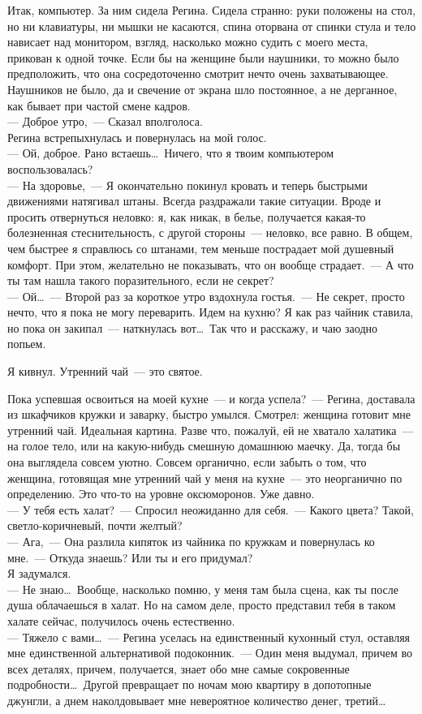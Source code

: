 Итак, компьютер. За ним сидела Регина. Сидела странно: руки положены на стол, 
но 
ни клавиатуры, ни мышки не касаются, спина оторвана от спинки стула и тело 
нависает над монитором, взгляд, насколько можно судить с моего места, прикован 
к 
одной точке. Если бы на женщине были наушники, то можно было предположить, что 
она сосредоточенно смотрит нечто очень захватывающее. Наушников не было, да и 
свечение от экрана шло постоянное, а не дерганное, как бывает при частой смене 
кадров.\\
--- Доброе утро,~--- Сказал вполголоса.\\
Регина встрепыхнулась и повернулась на мой голос.\\
--- Ой, доброе. Рано встаешь\ldots\ Ничего, что я твоим компьютером 
воспользовалась?\\
--- На здоровье,~--- Я окончательно покинул кровать и теперь быстрыми движениями 
натягивал штаны. Всегда раздражали такие ситуации. Вроде и просить отвернуться 
неловко: я, как никак, в белье, получается какая-то болезненная 
стеснительность, с другой стороны~--- неловко, все равно. В общем, чем быстрее я справлюсь со 
штанами, тем меньше пострадает мой душевный комфорт. При этом, желательно не 
показывать, что он вообще страдает.~--- А что ты там нашла такого 
поразительного, если не секрет?\\
--- Ой\ldots~--- Второй раз за короткое утро вздохнула гостья.~--- Не секрет, 
просто нечто, что я пока не могу переварить. Идем на кухню? Я как раз чайник ставила, 
но пока он закипал~--- наткнулась вот\ldots\ Так что и расскажу, и чаю заодно 
попьем.

Я кивнул. Утренний чай~--- это святое.

Пока успевшая освоиться на моей кухне~--- и когда успела?~--- Регина, доставала 
из шкафчиков кружки и заварку, быстро умылся. Смотрел: женщина готовит мне 
утренний чай. Идеальная картина. Разве что, пожалуй, ей не хватало халатика~--- на голое 
тело, или на какую-нибудь смешную домашнюю маечку. Да, тогда бы она выглядела 
совсем уютно. Совсем органично, если забыть о том, что женщина, готовящая мне 
утренний чай у меня на кухне~--- это неорганично по определению. Это что-то на 
уровне оксюморонов. Уже давно.\\
--- У тебя есть халат?~--- Спросил неожиданно для себя.~--- Какого цвета? Такой, 
светло-коричневый, почти желтый?\\
--- Ага,~--- Она разлила кипяток из чайника по кружкам и повернулась ко мне.~--- 
Откуда знаешь? Или ты и его придумал?\\
Я задумался.\\
--- Не знаю\ldots\ Вообще, насколько помню, у меня там была сцена, как ты после 
душа облачаешься в халат. Но на самом деле, просто представил тебя в таком халате 
сейчас, получилось очень естественно.\\
--- Тяжело с вами\ldots~--- Регина уселась на единственный кухонный стул, 
оставляя мне единственной альтернативой подоконник.~--- Один меня выдумал, причем во всех 
деталях, причем, получается, знает обо мне самые сокровенные подробности\ldots\ 
Другой превращает по ночам мою квартиру в допотопные джунгли, а днем 
наколдовывает мне невероятное количество денег, третий\ldots


